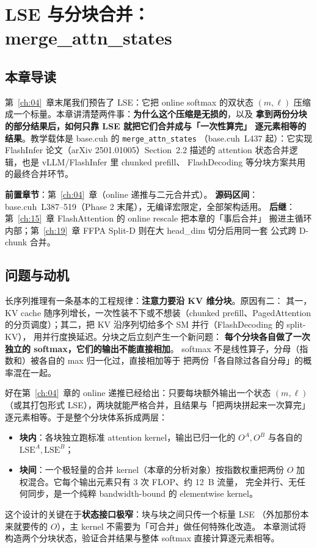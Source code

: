 \chapter{LSE 与分块合并：merge\_attn\_states}\label{ch:05}

\section{本章导读}

第~\ref{ch:04}~章末尾我们预告了 LSE：它把 online softmax 的双状态 $(m, \ell)$
压缩成一个标量。本章讲清楚两件事：\textbf{为什么这个压缩是无损的}，以及
\textbf{拿到两份分块的部分结果后，如何只靠 LSE 就把它们合并成与「一次性算完」
逐元素相等的结果}。教学载体是 base.cuh 的 \texttt{merge\_\allowbreak{}attn\_\allowbreak{}states}
（base.cuh~L437 起）：它实现 FlashInfer 论文（arXiv 2501.01005）Section~2.2
描述的 attention 状态合并逻辑，也是 vLLM/FlashInfer 里 chunked prefill、
FlashDecoding 等分块方案共用的最终合并环节。

\textbf{前置章节}：第~\ref{ch:04}~章（online 递推与二元合并式）。
\textbf{源码区间}：base.cuh~L387--519（Phase 2 末尾），无编译宏限定，全部架构适用。
\textbf{后继}：第~\ref{ch:15}~章 FlashAttention 的 online rescale 把本章的「事后合并」
搬进主循环内部；第~\ref{ch:19}~章 FFPA Split-D 则在大 head\_dim 切分后用同一套
公式跨 D-chunk 合并。

\section{问题与动机}

长序列推理有一条基本的工程规律：\textbf{注意力要沿 KV 维分块}。原因有二：
其一，KV cache 随序列增长，一次性装不下或不想装（chunked prefill、PagedAttention
的分页调度）；其二，把 KV 沿序列切给多个 SM 并行（FlashDecoding 的 split-KV），
用并行度换延迟。分块之后立刻产生一个新问题：
\textbf{每个分块各自做了一次独立的 softmax，它们的输出不能直接相加}。
softmax 不是线性算子，分母（指数和）被各自的 max 归一化过，直接相加等于
把两份「各自除过各自分母」的概率混在一起。

好在第~\ref{ch:04}~章的 online 递推已经给出：只要每块额外输出一个状态
$(m, \ell)$（或其打包形式 LSE），两块就能严格合并，且结果与「把两块拼起来一次算完」
逐元素相等。于是整个分块体系拆成两层：
\begin{itemize}
  \item \textbf{块内}：各块独立跑标准 attention kernel，输出已归一化的
        $O^{A}, O^{B}$ 与各自的 $\mathrm{LSE}^{A}, \mathrm{LSE}^{B}$；
  \item \textbf{块间}：一个极轻量的合并 kernel（本章的分析对象）按指数权重把两份
        $O$ 加权混合。它每个输出元素只有 3 次 FLOP、约 12~B 流量，
        完全并行、无任何同步，是一个纯粹 bandwidth-bound 的 elementwise kernel。
\end{itemize}
这个设计的关键在于\textbf{状态接口极窄}：块与块之间只传一个标量 LSE
（外加那份本来就要传的 $O$），主 kernel 不需要为「可合并」做任何特殊化改造。
本章测试将构造两个分块状态，验证合并结果与整体 softmax 直接计算逐元素相等。

